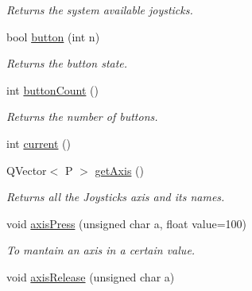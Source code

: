 \begin{DoxyCompactItemize}
\begin{DoxyCompactList}\small\item\em Returns the system available joysticks. \end{DoxyCompactList}\item 
\hypertarget{class_x_joystick_ad501613a09d6fc07a7054b8d6a8e83f1}{}bool \hyperlink{class_x_joystick_ad501613a09d6fc07a7054b8d6a8e83f1}{button} (int n)\label{class_x_joystick_ad501613a09d6fc07a7054b8d6a8e83f1}

\begin{DoxyCompactList}\small\item\em Returns the button state. \end{DoxyCompactList}\item 
\hypertarget{class_x_joystick_afb2d3fd919ba601fa8709bb97e1e0d48}{}int \hyperlink{class_x_joystick_afb2d3fd919ba601fa8709bb97e1e0d48}{button\+Count} ()\label{class_x_joystick_afb2d3fd919ba601fa8709bb97e1e0d48}

\begin{DoxyCompactList}\small\item\em Returns the number of buttons. \end{DoxyCompactList}\item 
int \hyperlink{class_x_joystick_a69ccd5ca34996e0e6b5b99ea7ddb4a5f}{current} ()
\item 
\hypertarget{class_x_joystick_ac72effd86a10e586deb6418db0b794fe}{}Q\+Vector$<$ P $>$ \hyperlink{class_x_joystick_ac72effd86a10e586deb6418db0b794fe}{get\+Axis} ()\label{class_x_joystick_ac72effd86a10e586deb6418db0b794fe}

\begin{DoxyCompactList}\small\item\em Returns all the Joystick\textquotesingle{}s axis and it\textquotesingle{}s names. \end{DoxyCompactList}\item 
\hypertarget{class_x_joystick_a436e8cb1940316d7ba3d0dd8d1f6002b}{}void \hyperlink{class_x_joystick_a436e8cb1940316d7ba3d0dd8d1f6002b}{axis\+Press} (unsigned char a, float value=100)\label{class_x_joystick_a436e8cb1940316d7ba3d0dd8d1f6002b}

\begin{DoxyCompactList}\small\item\em To mantain an axis in a certain value. \end{DoxyCompactList}\item 
\hypertarget{class_x_joystick_a55531560621ea0aedf9cf7f123294c79}{}void \hyperlink{class_x_joystick_a55531560621ea0aedf9cf7f123294c79}{axis\+Release} (unsigned char a)\label{class_x_joystick_a55531560621ea0aedf9cf7f123294c79}


\end{DoxyCompactItemize}
